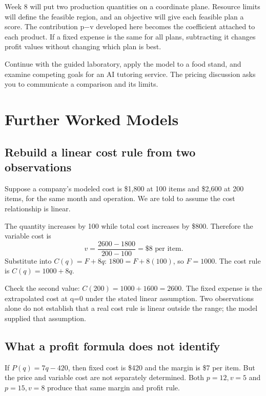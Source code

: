 \documentclass[11pt,letterpaper]{article}
\begin{document}
\begin{tcolorbox}[title={From Week 7 to Week 8},breakable,colback=warm,colbacktitle=warm,coltitle=gold,colframe=gold!35]

Week 8 will put two production quantities on a coordinate plane. Resource limits will define the feasible region, and an objective will give each feasible plan a score. The contribution p$-$v developed here becomes the coefficient attached to each product. If a fixed expense is the same for all plans, subtracting it changes profit values without changing which plan is best.


\end{tcolorbox}

Continue with the guided laboratory, apply the model to a food stand, and examine competing goals for an AI tutoring service. The pricing discussion asks you to communicate a comparison and its limits.


\clearpage
\section*{Further Worked Models}
\subsection*{Rebuild a linear cost rule from two observations}
Suppose a company's modeled cost is \$1,800 at 100 items and \$2,600 at 200 items, for the same month and operation. We are told to assume the cost relationship is linear.

The quantity increases by 100 while total cost increases by \$800. Therefore the variable cost is
\[
v=\frac{2600-1800}{200-100}=\$8\text{ per item}.
\]
Substitute into $C(q)=F+8q$: $1800=F+8(100)$, so $F=1000$. The cost rule is $C(q)=1000+8q$.

Check the second value: $C(200)=1000+1600=2600$. The fixed expense is the extrapolated cost at q=0 under the stated linear assumption. Two observations alone do not establish that a real cost rule is linear outside the range; the model supplied that assumption.

\subsection*{What a profit formula does not identify}
If $P(q)=7q-420$, then fixed cost is \$420 and the margin is \$7 per item. But the price and variable cost are not separately determined. Both $p=12,v=5$ and $p=15,v=8$ produce that same margin and profit rule.
\end{document}
